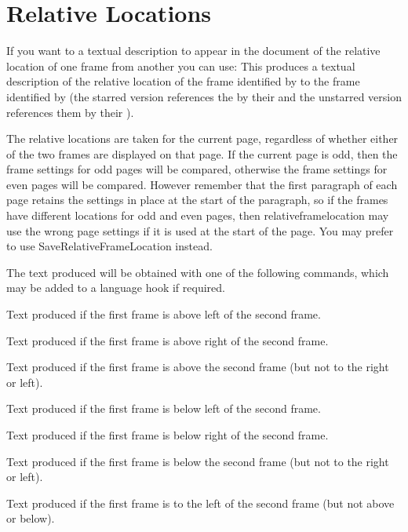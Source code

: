 \documentclass[fontsize=12pt]{scrbook}
\begin{document}
\section{Relative Locations}
\label{sec:relativelocs}

If you want to a textual description to appear in the document of 
the relative location of one \gls{frame} from another you can use:
This produces a textual description of the relative location of
the  \gls{frame} identified by  to the
 \gls{frame} identified by  (the starred
version references the  by their  and the
unstarred version references them by their ).

\begin{important}
The relative locations are taken for the current page,
regardless of whether either of the two frames are displayed on that
page. If the current page is odd, then the frame settings for odd pages
will be compared, otherwise the frame settings for even pages will
be compared. However remember that the first paragraph of each page
retains the settings in place at the start of the paragraph, so if the
frames have different locations for odd and even pages, then
\gls{relativeframelocation} may use the wrong page settings if it
is used at the start of the page. You may prefer to use
\gls{SaveRelativeFrameLocation} instead.
\end{important}

The text produced will be obtained with one of the following
commands, which may be added to a language hook if required.

Text produced if the first frame is above left of the second frame.

Text produced if the first frame is above right of the
second frame.

Text produced if the first frame is above the second frame
(but not to the right or left).

Text produced if the first frame is below left of the
second frame.

Text produced if the first frame is below right of the
second frame.

Text produced if the first frame is below the second frame
(but not to the right or left).

Text produced if the first frame is to the left of the 
second frame (but not above or below).
\end{document}
